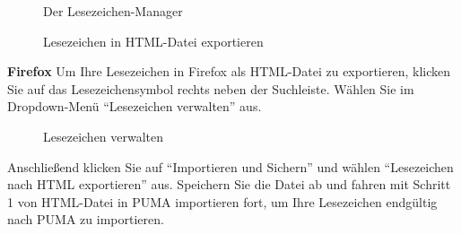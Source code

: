 \begin{figure}[h!]
 \centering
 \caption{Der Lesezeichen-Manager}
 \label{figure108}
\end{figure}
\begin{figure}[ht]
 \centering
 \caption{Lesezeichen in HTML-Datei exportieren}
 \label{figure109}
\end{figure}

\textbf{Firefox}
\newline Um Ihre Lesezeichen in Firefox als HTML-Datei zu exportieren, klicken Sie auf das Lesezeichensymbol rechts neben der Suchleiste. Wählen Sie im Dropdown-Menü \enquote{Lesezeichen verwalten} aus.

\begin{figure}[h!]
 \centering
 \caption{Lesezeichen verwalten}
 \label{figure110}
\end{figure}
Anschließend klicken Sie auf \enquote{Importieren und Sichern} und wählen \enquote{Lesezeichen nach HTML exportieren} aus. Speichern Sie die Datei ab und fahren mit Schritt 1 von HTML-Datei in PUMA importieren fort, um Ihre Lesezeichen endgültig nach PUMA zu importieren.  

